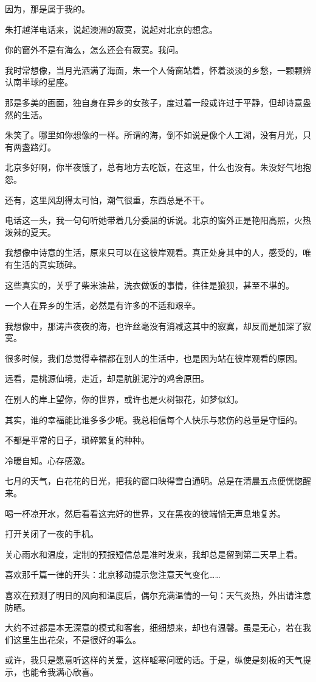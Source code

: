 \documentclass[12pt,a4paper]{article}
\def\blankrev{\vspace{1ex}}									%
\begin{document}
		因为，那是属于我的。

	\endwriting



		朱打越洋电话来，说起澳洲的寂寞，说起对北京的想念。\par
		你的窗外不是有海么，怎么还会有寂寞。我问。\par
		我时常想像，当月光洒满了海面，朱一个人倚窗站着，怀着淡淡的乡愁，一颗颗辨认南半球的星座。\par
		那是多美的画面，独自身在异乡的女孩子，度过着一段或许过于平静，但却诗意盎然的生活。\par
		朱笑了。哪里如你想像的一样。所谓的海，倒不如说是像个人工湖，没有月光，只有两盏路灯。\par
		北京多好啊，你半夜饿了，总有地方去吃饭，在这里，什么也没有。朱没好气地抱怨。\par
		还有，这里风刮得太可怕，潮气很重，东西总是不干。\par
		电话这一头，我一句句听她带着几分委屈的诉说。北京的窗外正是艳阳高照，火热泼辣的夏天。\par
		我想像中诗意的生活，原来只可以在这彼岸观看。真正处身其中的人，感受的，唯有生活的真实琐碎。\par
		这些真实的，关乎了柴米油盐，洗衣做饭的事情，往往是狼狈，甚至不堪的。\par
		一个人在异乡的生活，必然是有许多的不适和艰辛。\par
		我想像中，那涛声夜夜的海，也许丝毫没有消减这其中的寂寞，却反而是加深了寂寞。\par
		很多时候，我们总觉得幸福都在别人的生活中，也是因为站在彼岸观看的原因。\par
		远看，是桃源仙境，走近，却是肮脏泥泞的鸡舍原田。\par
		在别人的岸上望你，你的世界，或许也是火树银花，如梦似幻。\par
		其实，谁的幸福能比谁多多少呢。我总相信每个人快乐与悲伤的总量是守恒的。\par
		不都是平常的日子，琐碎繁复的种种。

	\endwriting



		冷暖自知。心存感激。

		\blankrev \blankrev
		七月的天气，白花花的日光，把我的窗口映得雪白通明。总是在清晨五点便恍惚醒来。\par
		喝一杯凉开水，然后看看这完好的世界，又在黑夜的彼端悄无声息地复苏。\par
		打开关闭了一夜的手机。\par
		关心雨水和温度，定制的预报短信总是准时发来，我却总是留到第二天早上看。\par
		喜欢那千篇一律的开头：北京移动提示您注意天气变化……\par
		喜欢在预测了明日的风向和温度后，偶尔充满温情的一句：天气炎热，外出请注意防晒。\par
		大约不过都是本无深意的模式和客套，细细想来，却也有温馨。虽是无心，若在我们这里生出花朵，不是很好的事么。\par
		或许，我只是愿意听这样的关爱，这样嘘寒问暖的话。于是，纵使是刻板的天气提示，也能令我满心欣喜。
\end{document}
